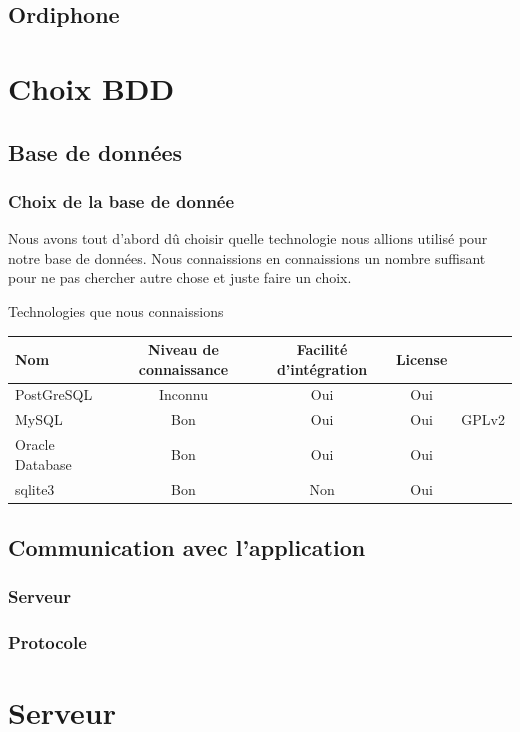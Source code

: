 \documentclass[a4paper, 12pt]{report}
\begin{document}
\section{Ordiphone}
	
\chapter{Choix BDD}
\section{Base de données}
\subsection{Choix de la base de donnée}
	Nous avons tout d'abord dû choisir quelle technologie nous allions utilisé pour notre base de données.
	Nous connaissions en connaissions un nombre suffisant pour ne pas chercher autre chose et juste faire un choix.
	\par
	\begin{center}
		Technologies que nous connaissions
		\par
		\begin{tabular}{|l|c|c|c|c|}
			\hline
			Nom & Niveau de connaissance & Facilité d'intégration & License \\
			\hline
			PostGreSQL & Inconnu & Oui & Oui\\
			\hline
			MySQL & Bon & Oui & Oui & GPLv2\\
			\hline
			Oracle Database & Bon & Oui & Oui \\
			\hline
			sqlite3 & Bon & Non & Oui \\
			\hline
		\end{tabular}
	\end{center}
\section{Communication avec l'application}
\subsection{Serveur}
\subsection{Protocole}
	
\chapter{Serveur}
\end{document}
